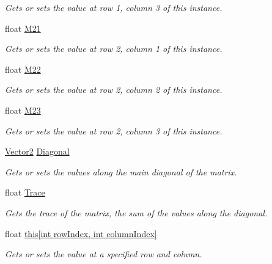 \begin{DoxyCompactItemize}
\begin{DoxyCompactList}\small\item\em Gets or sets the value at row 1, column 3 of this instance. \end{DoxyCompactList}\item 
float \hyperlink{struct_open_t_k_1_1_matrix2x3_a5cf6b1f3e091c3c7c421add7ba944983}{M21}
\begin{DoxyCompactList}\small\item\em Gets or sets the value at row 2, column 1 of this instance. \end{DoxyCompactList}\item 
float \hyperlink{struct_open_t_k_1_1_matrix2x3_a76b9c4f914ab97145bad10d29b63d9b5}{M22}
\begin{DoxyCompactList}\small\item\em Gets or sets the value at row 2, column 2 of this instance. \end{DoxyCompactList}\item 
float \hyperlink{struct_open_t_k_1_1_matrix2x3_a17381845696c10dbbff63cf673bf2f62}{M23}
\begin{DoxyCompactList}\small\item\em Gets or sets the value at row 2, column 3 of this instance. \end{DoxyCompactList}\item 
\hyperlink{struct_open_t_k_1_1_vector2}{Vector2} \hyperlink{struct_open_t_k_1_1_matrix2x3_a524f01afde7283253e5c9f62ddf4a766}{Diagonal}
\begin{DoxyCompactList}\small\item\em Gets or sets the values along the main diagonal of the matrix. \end{DoxyCompactList}\item 
float \hyperlink{struct_open_t_k_1_1_matrix2x3_a08c6565b22e96005dd8304f919e2d3ff}{Trace}
\begin{DoxyCompactList}\small\item\em Gets the trace of the matrix, the sum of the values along the diagonal. \end{DoxyCompactList}\item 
float \hyperlink{struct_open_t_k_1_1_matrix2x3_ab8d936784b9df55d9ae961b7185637a3}{this\mbox{[}int row\-Index, int column\-Index\mbox{]}}
\begin{DoxyCompactList}\small\item\em Gets or sets the value at a specified row and column. \end{DoxyCompactList}\end{DoxyCompactItemize}


